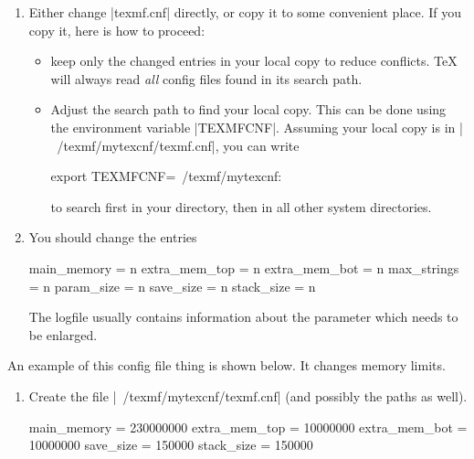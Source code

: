 {\begin{enumerate}
        |/usr/share/texmf/web2c/texmf.cnf|.
    \item Either change |texmf.cnf| directly, or copy it to some convenient
        place. If you copy it, here is how to proceed:
        \begin{itemize}
            \item keep only the changed entries in your local copy to
                reduce conflicts. \TeX{} will always read \emph{all} config
                files found in its search path.
            \item Adjust the search path to find your local copy. This can
                be done using the environment variable |TEXMFCNF|. Assuming
                your local copy is in |~/texmf/mytexcnf/texmf.cnf|, you can
                write
\begin{codeexample}
export TEXMFCNF=~/texmf/mytexcnf:
\end{codeexample}
                to search first in your directory, then in all other system
                directories.
        \end{itemize}
    \item You should change the entries
\begin{codeexample}
main_memory = n
extra_mem_top = n
extra_mem_bot = n
max_strings = n
param_size = n
save_size = n
stack_size = n
\end{codeexample}
        The logfile usually contains information about the parameter which
        needs to be enlarged.
\end{enumerate}
%
An example of this config file thing is shown below. It changes memory limits.
%
\begin{enumerate}
    \item Create the file |~/texmf/mytexcnf/texmf.cnf| (and possibly the
        paths as well).
\begin{codeexample}
main_memory = 230000000 %
extra_mem_top = 10000000     %
extra_mem_bot = 10000000     %
save_size = 150000    %
stack_size = 150000    %


\end{codeexample}
\end{enumerate}}
